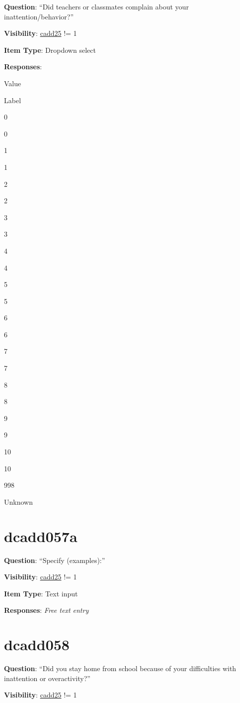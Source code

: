 \documentclass[]{book}
\begin{document}
\textbf{Question}: ``Did teachers or classmates complain about your inattention/behavior?''

\textbf{Visibility}: \protect\hyperlink{cadd25}{cadd25} != 1

\textbf{Item Type}: Dropdown select

\textbf{Responses}:

Value

Label

0

0

1

1

2

2

3

3

4

4

5

5

6

6

7

7

8

8

9

9

10

10

998

Unknown

\hypertarget{dcadd057a}{%
\section{dcadd057a}\label{dcadd057a}}

\textbf{Question}: ``Specify (examples):''

\textbf{Visibility}: \protect\hyperlink{cadd25}{cadd25} != 1

\textbf{Item Type}: Text input

\textbf{Responses}: \emph{Free text entry}

\hypertarget{dcadd058}{%
\section{dcadd058}\label{dcadd058}}

\textbf{Question}: ``Did you stay home from school because of your difficulties with inattention or overactivity?''

\textbf{Visibility}: \protect\hyperlink{cadd25}{cadd25} != 1
\end{document}

